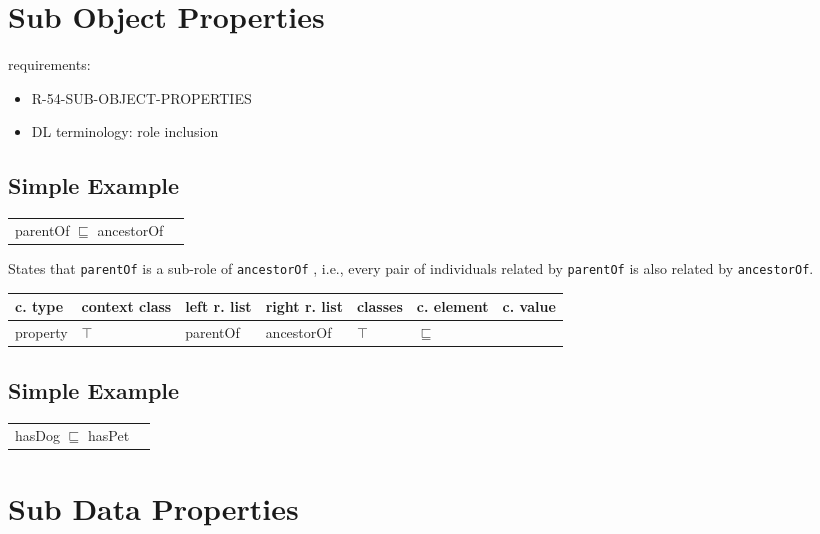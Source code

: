 \documentclass{llncs}
\newcommand{\ms}[1]{\texttt{#1}}
\newenvironment{gcotable}{
  \scriptsize
  \sffamily
  \vspace{0.3cm}
	\begin{center}
  \begin{tabular}{l|l|l|l|l|l|l}
  \hline
  \textbf{c. type} & \textbf{context class} & \textbf{left r. list} & \textbf{right r. list} & \textbf{classes} & \textbf{c. element} & \textbf{c. value} \\
  \hline

}{
  \hline
  \end{tabular}
	\end{center}
}
\newenvironment{DL}{
	\begin{center}
  \begin{tabular}{r l}

}{
  \end{tabular}
	\end{center}
}
\begin{document}
\section{Sub Object Properties}

requirements:

\begin{itemize}

	\item R-54-SUB-OBJECT-PROPERTIES
\end{itemize}



\begin{itemize}
	\item DL terminology: role inclusion 
\end{itemize}

\subsection{Simple Example}

\begin{DL}
parentOf $\sqsubseteq$ ancestorOf 
\end{DL}

States that \ms{parentOf} is a sub-role of \ms{ancestorOf} , i.e., every pair of individuals related by \ms{parentOf} is also related by \ms{ancestorOf}.

\begin{gcotable}
property & $\top$ & parentOf & ancestorOf & $\top$ & $\sqsubseteq$ \\
\end{gcotable}



\subsection{Simple Example}

\begin{DL}
hasDog $\sqsubseteq$ hasPet 
\end{DL}

\section{Sub Data Properties}
\end{document}
